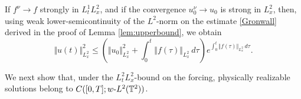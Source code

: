 \documentclass[reqno,12pt]{amsart}
\begin{document}
\begin{remark}
If $f^\nu \to f$ strongly in $L^1_tL^2_x$, and if the convergence $u_0^\nu \to u_0$ is strong in $L^2_x$, then, using weak lower-semicontinuity of the $L^2$-norm on the estimate \eqref{Gronwall} derived in the proof of Lemma \ref{lem:upperbound}, we obtain
\[
\Vert u(t) \Vert^2_{L^2_x}
\le
\left(
\Vert u_0 \Vert^2_{L^2_x}
+
\int_0^t \Vert f(\tau) \Vert_{L^2_x} \, d\tau
\right)
e^{\int_0^t \Vert f(\tau) \Vert_{L^2_x} \, d\tau}.
\]
\end{remark}




We next show that, under the $L^2_tL^2_x$-bound on the forcing, physically realizable solutions belong to $C([0,T];w\text{-}L^2(\mathbb{T}^2))$.
\end{document}

